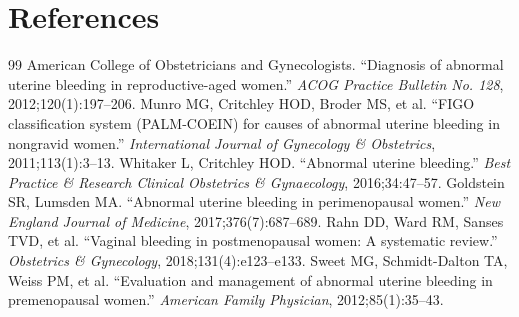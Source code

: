 \section*{References}
\begin{thebibliography}{99}
 American College of Obstetricians and Gynecologists. ``Diagnosis of abnormal uterine bleeding in reproductive-aged women.'' \textit{ACOG Practice Bulletin No. 128}, 2012;120(1):197--206.
 Munro MG, Critchley HOD, Broder MS, et al. ``FIGO classification system (PALM-COEIN) for causes of abnormal uterine bleeding in nongravid women.'' \textit{International Journal of Gynecology \& Obstetrics}, 2011;113(1):3--13.
 Whitaker L, Critchley HOD. ``Abnormal uterine bleeding.'' \textit{Best Practice \& Research Clinical Obstetrics \& Gynaecology}, 2016;34:47--57.
 Goldstein SR, Lumsden MA. ``Abnormal uterine bleeding in perimenopausal women.'' \textit{New England Journal of Medicine}, 2017;376(7):687--689.
 Rahn DD, Ward RM, Sanses TVD, et al. ``Vaginal bleeding in postmenopausal women: A systematic review.'' \textit{Obstetrics \& Gynecology}, 2018;131(4):e123--e133.
 Sweet MG, Schmidt-Dalton TA, Weiss PM, et al. ``Evaluation and management of abnormal uterine bleeding in premenopausal women.'' \textit{American Family Physician}, 2012;85(1):35--43.
\end{thebibliography}
